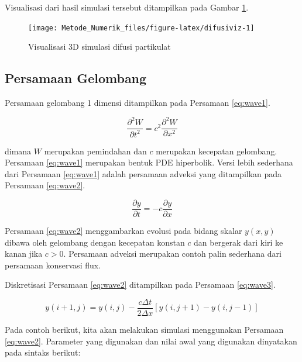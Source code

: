 \documentclass[
]{book}
\theoremstyle{definition}
\theoremstyle{definition}
\theoremstyle{definition}
\theoremstyle{definition}
\theoremstyle{remark}
\begin{document}
Visualisasi dari hasil simulasi tersebut ditampilkan pada Gambar \ref{fig:difusiviz}.

\begin{figure}

{\centering \texttt{[image: Metode\_Numerik\_files/figure-latex/difusiviz-1]} 

}

\caption{Visualisasi 3D simulasi difusi partikulat}\label{fig:difusiviz}
\end{figure}

\hypertarget{persamaan-gelombang}{%
\subsection{Persamaan Gelombang}\label{persamaan-gelombang}}

Persamaan gelombang 1 dimensi ditampilkan pada Persamaan \eqref{eq:wave1}.

\begin{equation}
\frac{\partial^2W}{\partial t^2}=c^2\frac{\partial^2W}{\partial x^2}
  \label{eq:wave1}
\end{equation}

dimana \(W\) merupakan pemindahan dan \(c\) merupakan kecepatan gelombang. Persamaan \eqref{eq:wave1} merupakan bentuk PDE hiperbolik. Versi lebih sederhana dari Persamaan \eqref{eq:wave1} adalah persamaan adveksi yang ditampilkan pada Persamaan \eqref{eq:wave2}.

\begin{equation}
\frac{\partial y}{\partial t}=-c\frac{\partial y}{\partial x}
  \label{eq:wave2}
\end{equation}

Persamaan \eqref{eq:wave2} menggambarkan evolusi pada bidang skalar \(y\left(x,y\right)\) dibawa oleh gelombang dengan kecepatan konstan \(c\) dan bergerak dari kiri ke kanan jika \(c>0\). Persamaan adveksi merupakan contoh palin sederhana dari persamaan konservasi flux.

Diskretisasi Persamaan \eqref{eq:wave2} ditampilkan pada Persamaan \eqref{eq:wave3}.

\begin{equation}
y\left(i+1,j\right)=y\left(i,j\right)-\frac{c\Delta t}{2\Delta x}\left[y\left(i,j+1\right)-y\left(i,j-1\right)\right]
  \label{eq:wave3}
\end{equation}

Pada contoh berikut, kita akan melakukan simulasi menggunakan Persamaan \eqref{eq:wave2}. Parameter yang digunakan dan nilai awal yang digunakan dinyatakan pada sintaks berikut:
\end{document}
